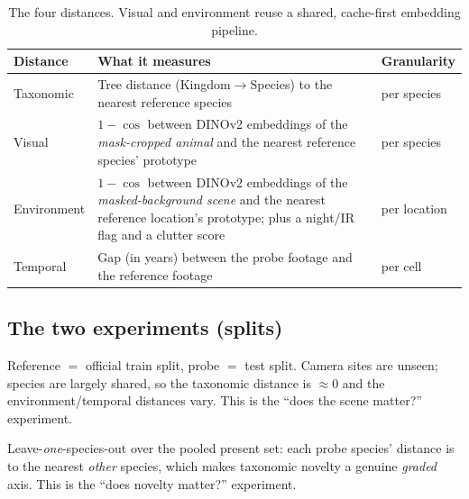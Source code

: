 \documentclass[11pt]{article}
\begin{document}
\begin{table}[h]
\centering
\small
\begin{tabularx}{\textwidth}{lYl}
\toprule
Distance & What it measures & Granularity \\
\midrule
Taxonomic   & Tree distance (Kingdom$\to$Species) to the nearest reference species & per species \\
Visual      & $1-\cos$ between DINOv2 embeddings of the \emph{mask-cropped animal} and the nearest
              reference species' prototype & per species \\
Environment & $1-\cos$ between DINOv2 embeddings of the \emph{masked-background scene} and the nearest
              reference location's prototype; plus a night/IR flag and a clutter score & per location \\
Temporal    & Gap (in years) between the probe footage and the reference footage & per cell \\
\bottomrule
\end{tabularx}
\caption{The four distances. Visual and environment reuse a shared, cache-first embedding pipeline.}
\end{table}

\subsection{The two experiments (splits)}
\begin{description}[leftmargin=1.4em,itemsep=3pt]
  \item[Split B --- location hold-out (secondary, tests H2).] Reference $=$ official train split,
        probe $=$ test split. Camera sites are unseen; species are largely shared, so the taxonomic
        distance is $\approx 0$ and the environment/temporal distances vary. This is the ``does the scene
        matter?'' experiment.
  \item[Split A --- species hold-out (primary, tests H1).] Leave-\emph{one}-species-out over the pooled
        present set: each probe species' distance is to the nearest \emph{other} species, which makes
        taxonomic novelty a genuine \emph{graded} axis. This is the ``does novelty matter?'' experiment.
\end{description}
\end{document}
